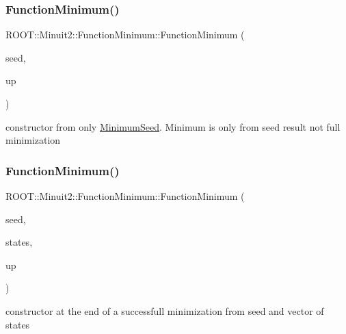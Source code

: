 \subsubsection{\texorpdfstring{FunctionMinimum()}{FunctionMinimum()}\hspace{0.1cm}{\footnotesize\ttfamily [1/10]}}
{\footnotesize\ttfamily R\+O\+O\+T\+::\+Minuit2\+::\+Function\+Minimum\+::\+Function\+Minimum (\begin{DoxyParamCaption}\item[{const \mbox{\hyperlink{classROOT_1_1Minuit2_1_1MinimumSeed}{Minimum\+Seed}} \&}]{seed,  }\item[{double}]{up }\end{DoxyParamCaption})\hspace{0.3cm}{\ttfamily [inline]}}



constructor from only \mbox{\hyperlink{classROOT_1_1Minuit2_1_1MinimumSeed}{Minimum\+Seed}}. Minimum is only from seed result not full minimization 

\mbox{\label{classROOT_1_1Minuit2_1_1FunctionMinimum_a0d5de11a4f528f8c0a0d061dbcf3e91e}} 
\subsubsection{\texorpdfstring{FunctionMinimum()}{FunctionMinimum()}\hspace{0.1cm}{\footnotesize\ttfamily [2/10]}}
{\footnotesize\ttfamily R\+O\+O\+T\+::\+Minuit2\+::\+Function\+Minimum\+::\+Function\+Minimum (\begin{DoxyParamCaption}\item[{const \mbox{\hyperlink{classROOT_1_1Minuit2_1_1MinimumSeed}{Minimum\+Seed}} \&}]{seed,  }\item[{const std\+::vector$<$ \mbox{\hyperlink{classROOT_1_1Minuit2_1_1MinimumState}{Minimum\+State}} $>$ \&}]{states,  }\item[{double}]{up }\end{DoxyParamCaption})\hspace{0.3cm}{\ttfamily [inline]}}



constructor at the end of a successfull minimization from seed and vector of states 

